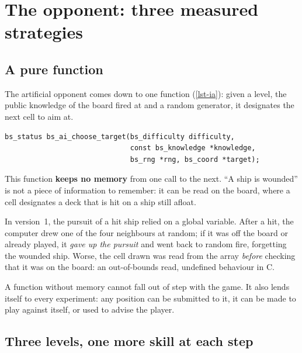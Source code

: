 \chapter{The opponent: three measured strategies}
\label{chap-adversaire}

\section{A pure function}

The artificial opponent comes down to one function (\cref{lst-ia}): given a level, the public
knowledge of the board fired at and a random generator, it designates the next cell to aim
at.

\begin{lstlisting}[caption={The whole opponent (\fichier{include/battleship/ai.h}).},
                   label={lst-ia}]
bs_status bs_ai_choose_target(bs_difficulty difficulty,
                              const bs_knowledge *knowledge,
                              bs_rng *rng, bs_coord *target);
\end{lstlisting}

This function \textbf{keeps no memory} from one call to the next. \enquote{A ship is
    wounded} is not a piece of information to remember: it can be read on the board, where a
 cell designates a deck that is hit on a ship still afloat.

\begin{attention}
    In version~1, the pursuit of a hit ship relied on a global variable. After a hit, the
    computer drew one of the four neighbours at random; if it was off the board or already
    played, it \emph{gave up the pursuit} and went back to random fire, forgetting the wounded
    ship. Worse, the cell drawn was read from the array \emph{before} checking that it was on
    the board: an out-of-bounds read, undefined behaviour in C.
\end{attention}

A function without memory cannot fall out of step with the game. It also lends itself to
every experiment: any position can be submitted to it, it can be made to play against
itself, or used to advise the player.

\section{Three levels, one more skill at each step}

